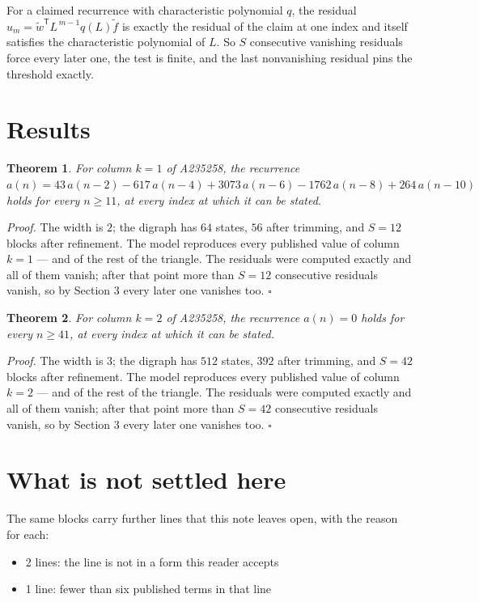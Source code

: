 \documentclass[11pt]{article}
\newtheorem{theorem}{Theorem}
\theoremstyle{definition}
\begin{document}
For a claimed recurrence with characteristic polynomial $q$, the residual $u_m = \tilde w^{\mathsf T}L^{\,m-1}q(L)\tilde f$ is exactly the residual of the claim at one index and itself satisfies the characteristic polynomial of $L$. So $S$ consecutive vanishing residuals force every later one, the test is finite, and the last nonvanishing residual pins the threshold exactly.

\section{Results}

\begin{theorem} For column $k = 1$ of A235258, the recurrence $a(n) = 43\,a(n-2) - 617\,a(n-4) + 3073\,a(n-6) - 1762\,a(n-8) + 264\,a(n-10)$ holds for every $n \ge 11$, at every index at which it can be stated.\end{theorem}

{\itshape Proof.} The width is $2$; the digraph has $64$ states, $56$ after trimming, and $S = 12$ blocks after refinement. The model reproduces every published value of column $k = 1$ --- and of the rest of the triangle. The residuals were computed exactly and all of them vanish; after that point more than $S = 12$ consecutive residuals vanish, so by Section 3 every later one vanishes too. $\square$

\begin{theorem} For column $k = 2$ of A235258, the recurrence $a(n) = 0$ holds for every $n \ge 41$, at every index at which it can be stated.\end{theorem}

{\itshape Proof.} The width is $3$; the digraph has $512$ states, $392$ after trimming, and $S = 42$ blocks after refinement. The model reproduces every published value of column $k = 2$ --- and of the rest of the triangle. The residuals were computed exactly and all of them vanish; after that point more than $S = 42$ consecutive residuals vanish, so by Section 3 every later one vanishes too. $\square$

\section{What is not settled here}

The same blocks carry further lines that this note leaves open, with the reason for each:

\begin{itemize}

\item 2 lines: the line is not in a form this reader accepts

\item 1 line: fewer than six published terms in that line

\end{itemize}
\end{document}
